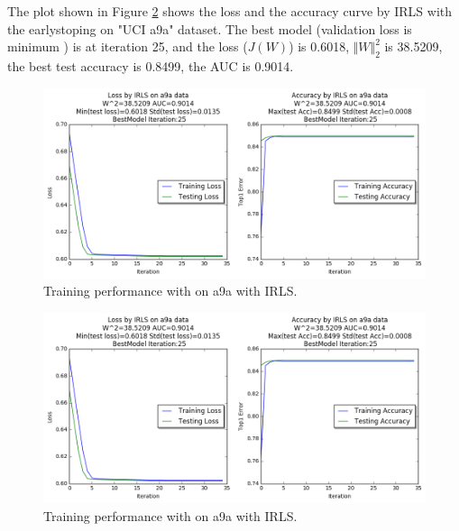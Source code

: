 \documentclass[a4paper]{article}
\begin{document}
 The plot shown in Figure \ref{lines} shows the loss and the accuracy curve by IRLS with the earlystoping on "UCI a9a" dataset.  The best model (validation loss is minimum ) is at iteration 25, and the loss ($J(W)$) is 0.6018, $\Vert W \Vert_2^2$ is 38.5209, the best test accuracy is 0.8499, the AUC is 0.9014. 
\begin{figure}
\begin{center}
\includegraphics[width=16cm]{../model/IRLS.png}
\end{center}
\caption{Training performance with  on a9a with IRLS.}\label{lines}
\end{figure}

\begin{figure}
\begin{center}
\includegraphics[width=16cm]{../model/IRLS.png}
\end{center}
\caption{Training performance with  on a9a with IRLS.}\label{lines}
\end{figure}




%
\end{document}
